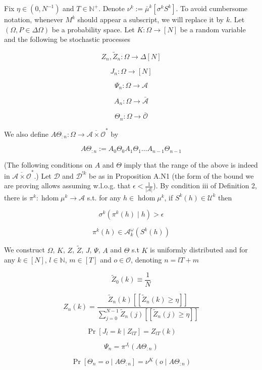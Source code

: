 \documentclass[a4paper]{article}
\newcommand{\Comment}[1]{}
\newcommand{\AP}[1]{\left(#1\right)}
\newcommand{\Nats}{\mathbb{N}}
\newcommand{\Abs}[1]{\left\vert #1 \right\vert}
\newcommand{\Ob}{\mathcal{O}}
\newcommand{\A}{\mathcal{A}}
\newcommand{\Ado}{\bar{\Ob}}
\newcommand{\Ada}{\bar{\A}}
\newcommand{\Adao}{\overline{\A \times \Ob}}
\newcommand{\Adfh}{\Adao^*}
\DeclareMathOperator{\HD}{hdom}
\newcommand{\UC}{\mathcal{U}}
\newcommand{\Dl}{\mathcal{D}}
\newcommand{\F}{\mathcal{F}}
\newcommand{\Z}{Z}
\newcommand{\J}{J}
\begin{document}
Fix $\eta\in\left(0,N^{-1}\right)$ and $T \in \Nats^+$. Denote $\nu^k:=\bar{\mu}^k\left[\sigma^k S^k\right]$. To avoid cumbersome notation, whenever $M^k$ should appear a subscript, we will replace it by $k$. Let $(\Omega,P \in \Delta\Omega)$ be a probability space\Comment{ and $\{\F_n \subseteq 2^\Omega\}_{n \in \Nats \sqcup \{-1\}}$ a filtration of $\Omega$}. Let $K: \Omega \rightarrow [N]$ be \Comment{measurable w.r.t. $\F_{-1}$}a random variable and the following be stochastic processes\Comment{ adapted to $\F$}

$$\Z_n,\tilde{\Z}_n: \Omega \rightarrow \Delta[N]$$

$$\J_n: \Omega \rightarrow [N]$$

$$\Psi_n: \Omega \rightarrow \A$$

$$A_n: \Omega \rightarrow \Ada$$

$$\Theta_n: \Omega \rightarrow \Ado$$

We also define $A\Theta_{:n}: \Omega \rightarrow \Adfh$ by

$$A\Theta_{:n}:= A_0\Theta_0A_1\Theta_1 \ldots A_{n-1}\Theta_{n-1}$$

(The following conditions on $A$ and $\Theta$ imply that the range of the above is indeed in $\Adfh$.) Let $\Dl$ and $\Dl^{!k}$ be as in Proposition A.N1 (the form of the bound we are proving allows assuming w.l.o.g. that $\epsilon < \frac{1}{\Abs{\A}}$). By condition iii of Definition 2, there is $\pi^k : \HD{\mu^k} \rightarrow \A$ s.t. for any $h \in \HD{\mu^k}$, if $S^k(h) \in \UC^k$ then

$$\sigma^k\AP{\pi^k(h) \mid h} > \epsilon$$

$$\pi^k(h) \in \A_k^\omega\AP{S^k(h)}$$

We construct $\Omega$\Comment{, $\F$}, $K$, $\Z$, $\tilde{\Z}$, $\J$, $\Psi$, $A$ and $\Theta$ s.t $K$ is uniformly distributed and for any $k \in [N]$, $l \in \Nats$, $m \in [T]$ and $o \in \Ob$, denoting $n = lT+m$

$$\tilde{\Z}_0(k)\equiv\frac{1}{N}$$

$$\Z_{n}(k) = \frac{\tilde{\Z}_{n}(k)[[\tilde{\Z}_{n}(k) \geq \eta]] }{\sum_{j = 0}^{N-1}\tilde{\Z}_{n}(j)[[\tilde{\Z}_{n}(j) \geq \eta]]}$$

$$\Pr\left[\J_{l} = k \mid Z_{lT}\right] = \Z_{lT}\left(k\right)$$

$$\Psi_{n} = \pi^{J_l}\AP{A\Theta_{:n}}$$

$$\Pr\left[\Theta_{n} = o \mid A\Theta_{:n}\right] = \nu^K\left(o \mid A\Theta_{:n}\right)$$
\end{document}
